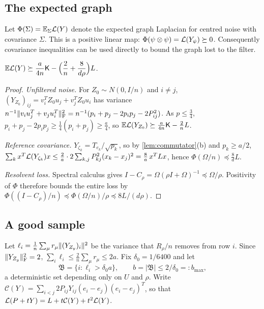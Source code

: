 \subsection{The expected graph}

Let $\Phi(\Sigma)=\mathbb E_\Sigma\mathcal L(Y)$ denote the expected graph Laplacian
for centred noise with covariance $\Sigma$. This is a positive linear map:
$\Phi(\psi\otimes\psi)=\mathcal L(Y_\psi)\succeq0$. Consequently covariance
inequalities can be used directly to bound the graph lost to the filter.

\begin{lemma}\label{lem:expected-graph}
$\displaystyle\mathbb E\mathcal L(Y)\succeq\frac a{4n}\mathsf K-\Bigl(\frac2n+\frac8{d\rho}\Bigr)L$.
\end{lemma}

\begin{proof}
\emph{Unfiltered noise.} For $Z_0\sim N(0,I/n)$ and $i\ne j$,
$(Y_{Z_0})_{ij}=v_i^TZ_0u_j+v_j^TZ_0u_i$ has variance
$n^{-1}\lVert v_iu_j^T+v_ju_i^T\rVert_{\mathrm F}^2=n^{-1}(p_i+p_j-2p_ip_j-2P_{ij}^2)$. As
$p\le\frac34$, $p_i+p_j-2p_ip_j\ge\frac14(p_i+p_j)\ge\frac a4$, so
$\mathbb E\mathcal L(Y_{Z_0})\succeq\frac a{4n}\mathsf K-\frac2nL$.

\emph{Reference covariance.} $Y_{\zeta_k}=T_{e_k}/\sqrt{p_k}$, so by
\cref{lem:commutator}(b) and $p_k\ge a/2$,
$\sum_kx^T\mathcal L(Y_{\zeta_k})x\le\frac2a\cdot2\sum_{k,j}P_{kj}^2(x_k-x_j)^2
=\frac8a\,x^TLx$, hence $\Phi(\Omega/n)\preceq\frac8dL$.

\emph{Resolvent loss.} Spectral calculus gives
$I-C_\rho=\Omega(\rho I+\Omega)^{-1}\preceq\Omega/\rho$.
Positivity of $\Phi$ therefore bounds the entire loss by
$\Phi((I-C_\rho)/n)\preceq\Phi(\Omega/n)/\rho\preceq8L/(d\rho)$.
\end{proof}

\subsection{A good sample}

Let $\ell_i=\frac1n\sum_\mu r_\mu\lVert (Y_{Z_y})_i\rVert^2$ be the variance that $R_\rho/n$
removes from row $i$. Since $\lVert Y_{Z_y}\rVert_{\mathrm F}^2=2$, $\sum_i\ell_i\le\frac2n\sum_\mu
r_\mu\le2a$. Fix $\delta_0=1/6400$ and let
\[
 \mathfrak B=\{i:\ell_i>\delta_0a\},\qquad b=|\mathfrak B|\le2/\delta_0=:b_{\max},
\]
a deterministic set depending only on $U$ and $\rho$. Write
$\mathcal C(Y)=\sum_{i<j}2P_{ij}Y_{ij}(e_i-e_j)(e_i-e_j)^T$, so that
$\mathcal L(P+tY)=L+t\mathcal C(Y)+t^2\mathcal L(Y)$.

